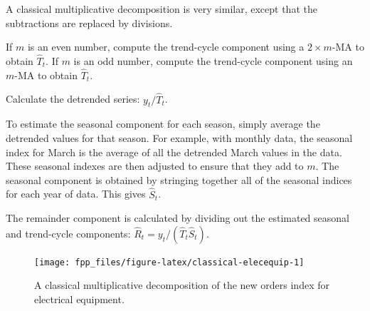 \documentclass[]{book}
\newenvironment{Shaded}{\begin{snugshade}}{\end{snugshade}}
\newcommand{\DataTypeTok}[1]{\textcolor[rgb]{0.13,0.29,0.53}{#1}}
\newcommand{\KeywordTok}[1]{\textcolor[rgb]{0.13,0.29,0.53}{\textbf{#1}}}
\newcommand{\NormalTok}[1]{#1}
\newcommand{\OperatorTok}[1]{\textcolor[rgb]{0.81,0.36,0.00}{\textbf{#1}}}
\newcommand{\StringTok}[1]{\textcolor[rgb]{0.31,0.60,0.02}{#1}}
\providecommand{\tightlist}{%
  \setlength{\itemsep}{0pt}\setlength{\parskip}{0pt}}
\begin{document}
A classical multiplicative decomposition is very similar, except that the subtractions are replaced by divisions.

\begin{description}
\tightlist
\item[Step 1]
If \(m\) is an even number, compute the trend-cycle component using a \(2\times m\)-MA to obtain \(\hat{T}_t\). If \(m\) is an odd number, compute the trend-cycle component using an \(m\)-MA to obtain \(\hat{T}_t\).
\item[Step 2]
Calculate the detrended series: \(y_t/ \hat{T}_t\).
\item[Step 3]
To estimate the seasonal component for each season, simply average the detrended values for that season. For example, with monthly data, the seasonal index for March is the average of all the detrended March values in the data. These seasonal indexes are then adjusted to ensure that they add to \(m\). The seasonal component is obtained by stringing together all of the seasonal indices for each year of data. This gives \(\hat{S}_t\).
\item[Step 4]
The remainder component is calculated by dividing out the estimated seasonal and trend-cycle components: \(\hat{R}_{t} = y_t /( \hat{T}_t \hat{S}_t)\).
\end{description}

\begin{Shaded}
\end{Shaded}

\begin{figure}

{\centering \texttt{[image: fpp\_files/figure-latex/classical-elecequip-1]} 

}

\caption{A classical multiplicative decomposition of the new orders index for electrical equipment.}\label{fig:classical-elecequip}
\end{figure}
\end{document}
